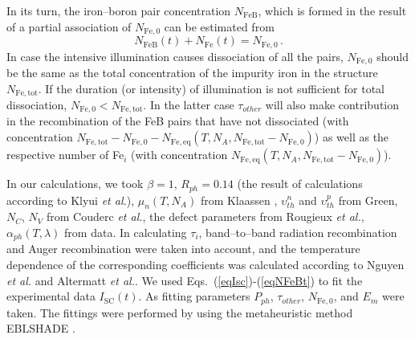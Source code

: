 \documentclass[%
 aip,jap,
 amsmath,amssymb,
 reprint,%
]{revtex4-1}
\begin{document}
In its turn, the iron--boron pair concentration $N_\mathrm{FeB}$, which is formed in the result of a partial association of $N_\mathrm{Fe,0}$ can be estimated from
\begin{equation}
\label{eqNFeBt}
N_\mathrm{FeB}(t)+N_\mathrm{Fe}(t)=N_\mathrm{Fe,0}\,.
\end{equation}
In case the intensive illumination causes dissociation of all the pairs,
$N_\mathrm{Fe,0}$ should be the same as the total concentration of the impurity iron in the structure $N_\mathrm{Fe,tot}$.
If the duration (or intensity) of illumination is not sufficient for total dissociation,
$N_\mathrm{Fe,0}< N_\mathrm{Fe,tot}$.
In the latter case $\tau_{other}$ will also make contribution in the
recombination of the FeB pairs that have not dissociated
(with concentration $N_\mathrm{Fe,tot}-N_\mathrm{Fe,0}-N_\mathrm{Fe,eq}(T, N_A, N_\mathrm{Fe,tot}-N_\mathrm{Fe,0})$)
as well as the respective number of Fe$_i$
(with concentration $N_\mathrm{Fe,eq}(T, N_A, N_\mathrm{Fe,tot}-N_\mathrm{Fe,0})$).

In our calculations,
we took $\beta=1$,
$R_{ph}=0.14$ (the result of calculations  according to Klyui \emph{et al.}\cite{KostRefl2000}),
$\mu_n(T, N_A)$ from Klaassen \cite{KLAASSEN953},
$\upsilon_{th}^n$ and $\upsilon_{th}^p$ from Green\cite{Nc:Green},
$N_C$, $N_V$ from Couderc \emph{et al.}\cite{Si_ni_Couderc},
the defect parameters from Rougieux \emph{et al.}\cite{ROUGIEUX2018},
$\alpha_{ph} (T,\lambda)$ from data\cite{Si:Absorb,GreenOptic}.
In calculating $\tau_i$, band--to--band radiation recombination and Auger recombination were taken into account,
and the temperature dependence of the corresponding coefficients
was calculated according to Nguyen \emph{et al.}\cite{Si_BtB} and Altermatt \emph{et al.}\cite{Si_Auger}.
We used Eqs.~(\ref{eqIsc})-(\ref{eqNFeBt}) to fit the experimental data $I_\mathrm{SC}(t)$.
As fitting parameters  $P_{ph}$, $\tau_{other}$, $N_\mathrm{Fe,0}$, and $E_m$  were taken.
The fittings were performed by using the metaheuristic method EBLSHADE \cite{EBLSHADE}.
\end{document}
